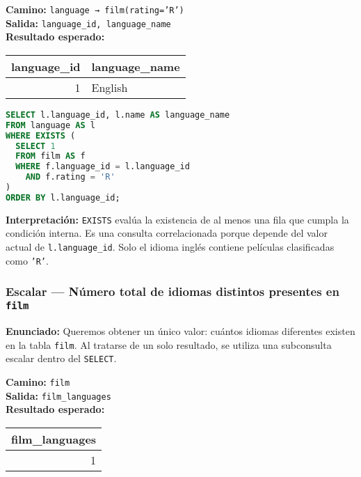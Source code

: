 \documentclass[12pt,a4paper]{article}
\begin{document}
\textbf{Camino:} \texttt{language → film(rating='R')}\\
\textbf{Salida:} \texttt{language\_id, language\_name}\\

\textbf{Resultado esperado:}

\begin{center}
\begin{tabular}{rl}
\toprule
\textbf{language\_id} & \textbf{language\_name} \\
\midrule
1 & English \\
\bottomrule
\end{tabular}
\end{center}

\begin{lstlisting}[language=SQL]
SELECT l.language_id, l.name AS language_name
FROM language AS l
WHERE EXISTS (
  SELECT 1
  FROM film AS f
  WHERE f.language_id = l.language_id
    AND f.rating = 'R'
)
ORDER BY l.language_id;
\end{lstlisting}

\vspace{0.5em}
\textbf{Interpretación:}  
\texttt{EXISTS} evalúa la existencia de al menos una fila que cumpla la condición interna.  
Es una consulta correlacionada porque depende del valor actual de \texttt{l.language\_id}.  
Solo el idioma inglés contiene películas clasificadas como \texttt{'R'}.

\subsubsection*{Escalar — Número total de idiomas distintos presentes en \texttt{film}}
\textbf{Enunciado:}  
Queremos obtener un único valor: cuántos idiomas diferentes existen en la tabla \texttt{film}.  
Al tratarse de un solo resultado, se utiliza una subconsulta escalar dentro del \texttt{SELECT}.

\textbf{Camino:} \texttt{film}\\
\textbf{Salida:} \texttt{film\_languages}\\

\textbf{Resultado esperado:}

\begin{center}
\begin{tabular}{r}
\toprule
\textbf{film\_languages} \\
\midrule
1 \\
\bottomrule
\end{tabular}
\end{center}
\end{document}
